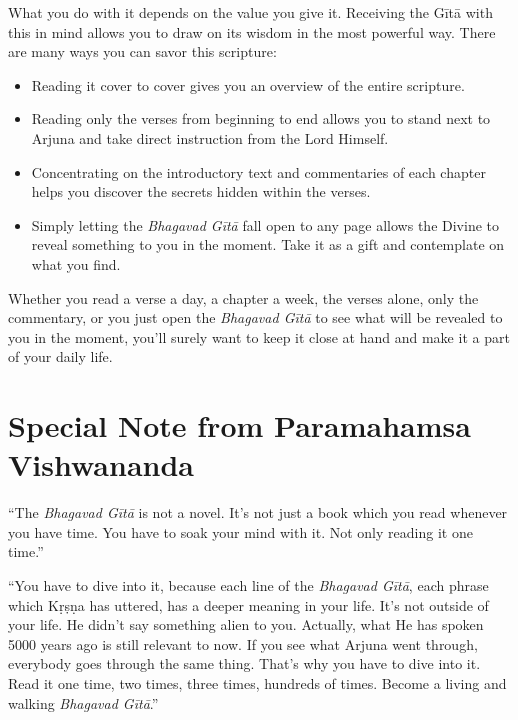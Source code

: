 What you do with it depends on the value you give it. Receiving the Gītā with this in mind allows you to draw on its wisdom in the most powerful way. There are many ways you can savor this scripture: 

\begin{itemize}[itemsep=1pt, topsep=6pt]

\item Reading it cover to cover gives you an overview of the entire scripture. 

\item Reading only the verses from beginning to end allows you to stand next to Arjuna and take direct instruction from the Lord Himself. 

\item Concentrating on the introductory text and commentaries of each chapter helps you discover the secrets hidden within the verses. 

\item Simply letting the \textit{Bhagavad Gītā} fall open to any page allows the Divine to reveal something to you in the moment. Take it as a gift and contemplate on what you find. 

\end{itemize}

Whether you read a verse a day, a chapter a week, the verses alone, only the commentary, or you just open the \textit{Bhagavad Gītā} to see what will be revealed to you in the moment, you’ll surely want to keep it close at hand and make it a part of your daily life.

\section{Special Note from Paramahamsa Vishwananda}\label{sec-special-note-from-paramahamsa-vishwananda}

\enquote{The \textit{Bhagavad Gītā} is not a novel. It's not just a book which you read whenever you have time. You have to soak your mind with it. Not only reading it one time.}

\enquote{You have to dive into it, because each line of the \textit{Bhagavad Gītā}, each phrase which Kṛṣṇa has uttered, has a deeper meaning in your life. It’s not outside of your life. He didn’t say something alien to you. Actually, what He has spoken 5000 years ago is still relevant to now. If you see what Arjuna went through, everybody goes through the same thing. That’s why you have to dive into it. Read it one time, two times, three times, hundreds of times. Become a living and walking \textit{Bhagavad Gītā}.}